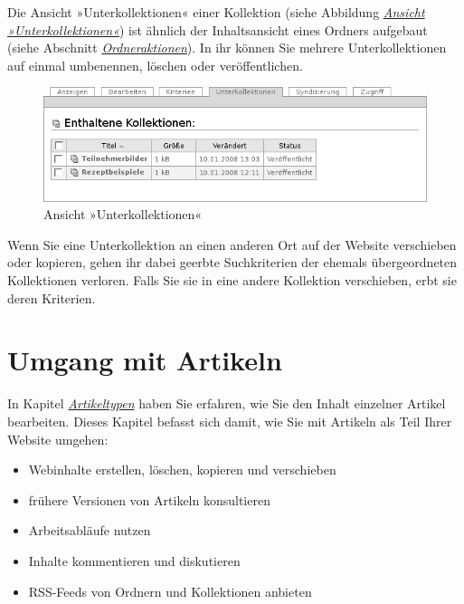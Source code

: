 \documentclass[a4paper,12pt,ngerman]{manual}
\begin{document}
Die Ansicht »Unterkollektionen« einer Kollektion (siehe Abbildung
\hyperlink{fig-unterthemen}{\emph{Ansicht »Unterkollektionen«}}) ist ähnlich der Inhaltsansicht eines Ordners
aufgebaut (siehe Abschnitt \hyperlink{sec-ordner-aktionen}{\emph{Ordneraktionen}}). In ihr können
Sie mehrere Unterkollektionen auf einmal umbenennen, löschen oder
veröffentlichen.
\hypertarget{fig-unterthemen}{}\begin{figure}[htbp]
\centering

\includegraphics{unterthemen.png}
\caption{Ansicht »Unterkollektionen«}\end{figure}

Wenn Sie eine Unterkollektion an einen anderen Ort auf der Website verschieben
oder kopieren, gehen ihr dabei geerbte Suchkriterien der ehemals
übergeordneten Kollektionen verloren. Falls Sie sie in
eine andere Kollektion verschieben, erbt sie deren Kriterien.

\resetcurrentobjects
\hypertarget{--doc-umgang/umgang}{}

\hypertarget{sec-umgang}{}\chapter{Umgang mit Artikeln}

In Kapitel \hyperlink{sec-inhaltstypen}{\emph{Artikeltypen}} haben Sie erfahren, wie Sie den Inhalt
einzelner Artikel bearbeiten. Dieses Kapitel befasst sich damit, wie Sie mit
Artikeln als Teil Ihrer Website umgehen:
\begin{itemize}
\item {} 
Webinhalte erstellen, löschen, kopieren und verschieben

\item {} 
frühere Versionen von Artikeln konsultieren

\item {} 
Arbeitsabläufe nutzen

\item {} 
Inhalte kommentieren und diskutieren

\item {} 
RSS-Feeds von Ordnern und Kollektionen anbieten

\end{itemize}
\end{document}

